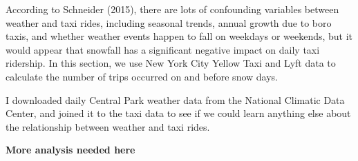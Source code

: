 \documentclass[12pt,twoside]{reedthesis}
\newenvironment{Shaded}{\begin{snugshade}}{\end{snugshade}}
\newcommand{\KeywordTok}[1]{\textcolor[rgb]{0.13,0.29,0.53}{\textbf{#1}}}
\newcommand{\DataTypeTok}[1]{\textcolor[rgb]{0.13,0.29,0.53}{#1}}
\newcommand{\DecValTok}[1]{\textcolor[rgb]{0.00,0.00,0.81}{#1}}
\newcommand{\StringTok}[1]{\textcolor[rgb]{0.31,0.60,0.02}{#1}}
\newcommand{\CommentTok}[1]{\textcolor[rgb]{0.56,0.35,0.01}{\textit{#1}}}
\newcommand{\OperatorTok}[1]{\textcolor[rgb]{0.81,0.36,0.00}{\textbf{#1}}}
\newcommand{\NormalTok}[1]{#1}
\theoremstyle{definition}
\theoremstyle{definition}
\theoremstyle{definition}
\theoremstyle{remark}
\begin{document}
According to Schneider (2015), there are lots of confounding variables
between weather and taxi rides, including seasonal trends, annual growth
due to boro taxis, and whether weather events happen to fall on weekdays
or weekends, but it would appear that snowfall has a significant
negative impact on daily taxi ridership. In this section, we use New
York City Yellow Taxi and Lyft data to calculate the number of trips
occurred on and before snow days.
\begin{Shaded}
\end{Shaded}
I downloaded daily Central Park weather data from the National Climatic
Data Center, and joined it to the taxi data to see if we could learn
anything else about the relationship between weather and taxi rides.

\textbf{More analysis needed here}
\end{document}
